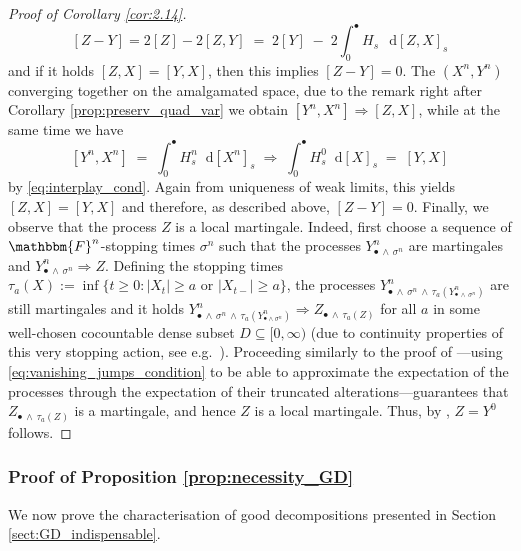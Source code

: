 \documentclass[11pt]{article}
\theoremstyle{definition}\newtheorem{example}[theorem]{Example}
\theoremstyle{definition}\newtheorem{counterexample}[theorem]{Counterexample}
\theoremstyle{definition}\newtheorem{remark}[theorem]{Remark}
\theoremstyle{definition}\newtheorem{defi}[theorem]{Definition}
\numberwithin{equation}{section}
\newcommand*\diff{\mathop{}\!\mathrm{d}}								%
\renewcommand{\|}{\; : \, \;}											%
\begin{document}
\begin{proof}[Proof of Corollary \ref{cor:2.14}]
	$$ [Z-Y] =  2[Z] - 2[Z,Y] \; = \; 2[Y] \; - \; 2 \int_0^\bullet H_s \, \diff [Z, X]_s$$
	and if it holds $[Z, X]=[Y, X]$, then this implies $[Z-Y]=0$. The $(X^n, Y^n)$ converging together on the amalgamated space, due to the remark right after Corollary \ref{prop:preserv_quad_var} we obtain $[Y^n, X^n]  \Rightarrow  [Z,X]$,
	while at the same time we have
	$$ [Y^n, X^n] \; = \; \int_0^\bullet  H^n_s \diff [X^n]_s \; \Rightarrow \; \int_0^\bullet  H^0_s \diff [X]_s \; = \; [Y, X]$$
	by \eqref{eq:interplay_cond}. Again from uniqueness of weak limits, this yields $[Z,X]=[Y,X]$ and therefore, as described above, $[Z-Y]=0$. Finally, we observe that the process $Z$ is a local martingale. Indeed, first choose a sequence of $\mathbbm{F}^n$-stopping times $\sigma^n$ such that the processes $Y^n_{\bullet \, \wedge\,  \sigma^n}$ are martingales and $Y^n_{\bullet \, \wedge\,  \sigma^n } \Rightarrow Z$. Defining the stopping times $\tau_a(X):= \operatorname{inf} \{ t \ge 0 : |X_t| \ge a \text{ or } |X_{t-}|\ge a\}$, the processes $Y^n_{\bullet \, \wedge \, \sigma^n \, \wedge \,\tau_a(Y^n_{\bullet \, \wedge \, \sigma^n})}$ are still martingales and it holds $Y^n_{\bullet \, \wedge\, \sigma^n\, \wedge \, \tau_a(Y^n_{\bullet \wedge \sigma^n})} \Rightarrow Z_{\bullet \, \wedge \, \tau_a(Z)}$ for all $a$ in some well-chosen cocountable dense subset $D \subseteq [0,\infty)$ (due to continuity properties of this very stopping action, see e.g.~\cite[Prop.~VI.2.12]{shiryaev}). Proceeding similarly to the proof of \cite[Prop.~IX.1.12]{shiryaev}---using \eqref{eq:vanishing_jumps_condition} to be able to approximate the expectation of the processes through the expectation of their truncated alterations---guarantees that $Z_{\bullet \, \wedge \, \tau_a(Z)}$ is a martingale, and hence $Z$ is a local martingale. Thus, by \cite[Prop.~I.4.50d]{shiryaev}, $Z=Y^0$ follows.
\end{proof}

\subsubsection{Proof of Proposition \ref{prop:necessity_GD}}\label{sect:proof_GD_indispensable}

We now prove the characterisation of good decompositions presented in Section \ref{sect:GD_indispensable}.
\end{document}
